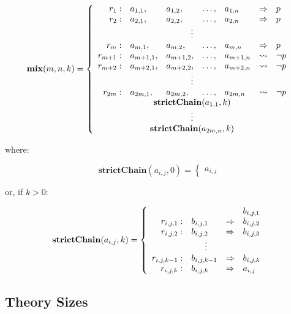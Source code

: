 {\[\mathbf{mix}(m,n,k) =  \left\{ \begin{array}{rllllll}
   r_{1}: & a_{1,1}, & a_{1,2}, & \ldots, & a_{1,n} & \Rightarrow & p \\
   r_{2}: & a_{2,1}, & a_{2,2}, & \ldots, & a_{2,n} & \Rightarrow & p \\
   \multicolumn{7}{c}{\vdots} \\
   r_{m}: & a_{m,1}, & a_{m,2}, & \ldots, & a_{m,n} & \Rightarrow & p \\
   r_{m+1}: & a_{m+1,1}, & a_{m+1,2}, & \ldots, & a_{m+1,n} & \leadsto & \neg p \\
   r_{m+2}: & a_{m+2,1}, & a_{m+2,2}, & \ldots, & a_{m+2,n} & \leadsto & \neg p \\
   \multicolumn{7}{c}{\vdots} \\
   r_{2m}: & a_{2m,1}, & a_{2m,2}, & \ldots, & a_{2m,n} & \leadsto & \neg p \\
   \multicolumn{7}{c}{\mathbf{strictChain}(a_{1,1},k)} \\
   \multicolumn{7}{c}{\vdots} \\
   \multicolumn{7}{c}{\mathbf{strictChain}(a_{2m,n},k)}
\end{array} \right.\]

\noindent where:

\[\mathbf{strictChain}(a_{i,j},0) =  \left\{ \begin{array}{l}
   a_{i,j}
\end{array} \right.\]

\noindent or, if $k > 0$:

\[\mathbf{strictChain}(a_{i,j},k) =  \left\{ \begin{array}{rlll}
   & & & b_{i,j,1} \\
   r_{i,j,1}: & b_{i,j,1} & \Rightarrow & b_{i,j,2} \\
   r_{i,j,2}: & b_{i,j,2} & \Rightarrow & b_{i,j,3} \\
   \multicolumn{4}{c}{\vdots} \\
   r_{i,j,k-1}: & b_{i,j,k-1} & \Rightarrow & b_{i,j,k} \\
   r_{i,j,k}: & b_{i,j,k} & \Rightarrow & a_{i,j} 
\end{array} \right.\]



\subsection{Theory Sizes} %

}
